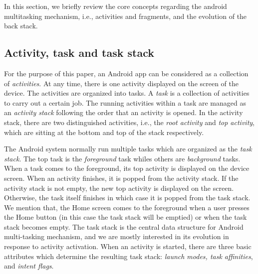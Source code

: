 

In this section, we briefly review the core concepts regarding the android multitasking mechanism, i.e., activities and fragments, and the evolution of the back stack. 
 
\subsection{Activity, task and task stack}
For the purpose of this paper, an Android app can be considered as a collection of \emph{activities}. At any time, there is one activity displayed on the screen of the device. 
The activities are organized into tasks. 
A \emph{task} is a collection of activities %
to carry out a certain job. The running activities within a task are managed as an \emph{activity stack} 
following the order that an activity is opened. In the activity stack, there are two distinguished activities, i.e., the \emph{root activity} and \emph{top activity}, which are sitting at the bottom and top of the stack respectively. %

The Android system normally run multiple tasks which are organized as the \emph{task stack}. The top task is the \emph{foreground} task whiles others are \emph{background} tasks. %
%
When a task comes to the foreground, its top activity is displayed on the device screen. When an activity finishes, it is popped from the activity stack. If the activity stack is not empty, the new top activity is displayed on the screen. Otherwise, the task itself finishes in which case it is popped from the task stack.  
We mention that, the Home screen comes to the foreground when a user presses the Home button (in this case the task stack will be emptied) or when the task stack becomes empty. The task stack  is the central data structure for Android multi-tasking mechanism, and we are mostly interested in its evolution in response to activity activation. When an activity is started, there are three basic attributes which determine the resulting task stack: \emph{launch modes, task affinities}, and \emph{intent flags}. %


